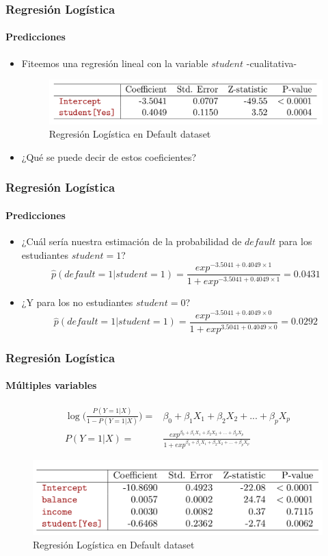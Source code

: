 \documentclass{beamer}
\begin{document}
\begin{frame}
\frametitle{Regresión Logística}
\framesubtitle{Predicciones}
\begin{itemize}
	\item Fiteemos una regresión lineal con la variable $student$ -cualitativa-
	\begin{figure}[H]	
		\centering
		\includegraphics[width=0.9\linewidth, height=0.2\textheight]{./img/04}
		\caption{Regresión Logística en Default dataset \cite{hastie02}}
	\end{figure}
	\item ¿Qué se puede decir de estos coeficientes?
\end{itemize}
\end{frame}

\begin{frame}
\frametitle{Regresión Logística}
\framesubtitle{Predicciones}
\begin{itemize}
	\item ¿Cuál sería nuestra estimación de la probabilidad de $default$ para los estudiantes $student=1$?
	\begin{equation}
	\hat{p}(default=1 | student=1) =  \frac{exp^{-3.5041+0.4049\times1}}{1+exp^{-3.5041+0.4049\times1}} = 0.0431
	\end{equation}
	
	\item ¿Y para los no estudiantes $student=0$?
	\begin{equation}
	\hat{p}(default=1 | student=1)= \frac{exp^{-3.5041+0.4049\times0}}{1+exp^{3.5041+0.4049\times0}} = 0.0292
	\end{equation}
\end{itemize}
\end{frame}



\begin{frame}
\frametitle{Regresión Logística}
\framesubtitle{Múltiples variables}
	\begin{align}
		\log \Bigg(\frac{P(Y=1|X)}{1-P(Y=1|X)}\Bigg) = & \beta_{0} + \beta_{1}X_{1} + \beta_{2}X_{2} + ... + \beta_{p}X_{p} \\
		P(Y=1 | X) = & \frac{exp^{\beta_{0} + \beta_{1}X_{1} + \beta_{2}X_{2} + ... + \beta_{p}X_{p}}}{1+exp^{\beta_{0} + \beta_{1}X_{1} + \beta_{2}X_{2} + ... + \beta_{p}X_{p}}}
	\end{align}
	\begin{figure}[H]	
		\centering
		\includegraphics[width=0.9\linewidth, height=0.25\textheight]{./img/05}
		\caption{Regresión Logística en Default dataset \cite{hastie02}}
	\end{figure}
\end{frame}
\end{document}
